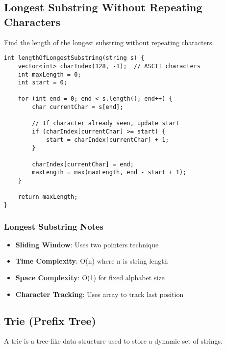 \documentclass[11pt,a4paper]{article}
\begin{document}
\newpage
\subsection{Longest Substring Without Repeating Characters}
Find the length of the longest substring without repeating characters.

\begin{lstlisting}[caption={Longest Substring Without Repeating Characters}]
int lengthOfLongestSubstring(string s) {
    vector<int> charIndex(128, -1);  // ASCII characters
    int maxLength = 0;
    int start = 0;
    
    for (int end = 0; end < s.length(); end++) {
        char currentChar = s[end];
        
        // If character already seen, update start
        if (charIndex[currentChar] >= start) {
            start = charIndex[currentChar] + 1;
        }
        
        charIndex[currentChar] = end;
        maxLength = max(maxLength, end - start + 1);
    }
    
    return maxLength;
}
\end{lstlisting}

\subsubsection*{Longest Substring Notes}
\begin{itemize}
\item \textbf{Sliding Window}: Uses two pointers technique
\item \textbf{Time Complexity}: O(n) where n is string length
\item \textbf{Space Complexity}: O(1) for fixed alphabet size
\item \textbf{Character Tracking}: Uses array to track last position
\end{itemize}

\newpage
\subsection{Trie (Prefix Tree)}
A trie is a tree-like data structure used to store a dynamic set of strings.
\end{document}
